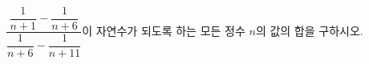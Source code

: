 $\dfrac{\dfrac{1}{n+1}-\dfrac{1}{n+6}}{\dfrac{1}{n+6}-\dfrac{1}{n+11}}$이 자연수가 되도록 하는 모든 정수 $n$의 값의 합을 구하시오.
